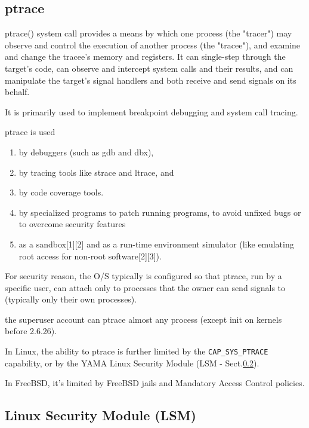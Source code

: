 \subsection{ptrace}
\label{sec:ptrace}

ptrace() system call provides a means by which one process (the "tracer") may
observe and control the execution of another process (the "tracee"), and examine
and change the tracee's memory and registers.
It can single-step through the target's code, can observe and intercept system
calls and their results, and can manipulate the target's signal handlers and
both receive and send signals on its behalf.

It is primarily used to implement breakpoint debugging and system call tracing.

ptrace is used 
\begin{enumerate}
  \item by debuggers (such as gdb and dbx), 
  
  \item by tracing tools like strace and ltrace, and 
  
  \item by code coverage tools.
  
  \item by specialized programs to patch running programs, to avoid unfixed bugs or to overcome security features
  
  \item as a sandbox[1][2] and as a run-time environment simulator (like emulating root access for non-root software[2][3]).
  
\end{enumerate}


For security reason, the O/S typically is configured so that ptrace, run by a
specific user, can attach only to processes that the owner can send signals to
(typically only their own processes).

the superuser account can ptrace almost any process (except init on kernels
before 2.6.26).

In Linux, the ability to ptrace is further limited by the \verb!CAP_SYS_PTRACE! capability,
or by the YAMA Linux Security Module (LSM - Sect.\ref{sec:LSM}).

In FreeBSD, it's limited by FreeBSD jails and Mandatory Access Control policies.

\subsection{Linux Security Module (LSM)}
\label{sec:LSM}

